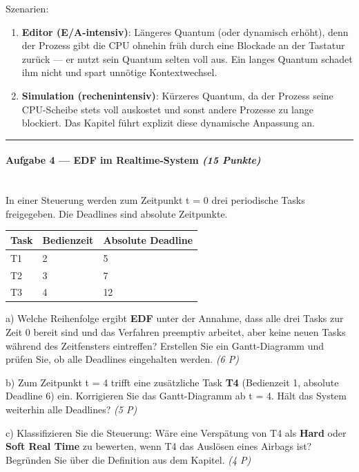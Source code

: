 \documentclass[11pt, a4paper]{article}
\begin{document}
Szenarien:

\begin{enumerate}
  \item \textbf{Editor (E/A-intensiv)}: Längeres Quantum (oder dynamisch erhöht), denn der Prozess gibt die CPU ohnehin früh durch eine Blockade an der Tastatur zurück — er nutzt sein Quantum selten voll aus. Ein langes Quantum schadet ihm nicht und spart unnötige Kontextwechsel.
  \item \textbf{Simulation (rechenintensiv)}: Kürzeres Quantum, da der Prozess seine CPU-Scheibe stets voll auskostet und sonst andere Prozesse zu lange blockiert. Das Kapitel führt explizit diese dynamische Anpassung an.
\end{enumerate}


\noindent\textcolor{rulegray}{\rule{\linewidth}{0.4pt}}


\paragraph{Aufgabe 4 — EDF im Realtime-System \textit{(15 Punkte)}}\mbox{}\\[2pt]

In einer Steuerung werden zum Zeitpunkt t = 0 drei periodische Tasks freigegeben. Die Deadlines sind absolute Zeitpunkte.



{\small
\begin{tabularx}{\linewidth}{XXX}
\hline
\rowcolor{tableheadbg}
{\color{white}\textbf{Task}} & {\color{white}\textbf{Bedienzeit}} & {\color{white}\textbf{Absolute Deadline}} \\[2pt]
\hline
\endhead
\hline
\endfoot
T1 & 2 & 5 \\
T2 & 3 & 7 \\
T3 & 4 & 12 \\
\end{tabularx}
}


a) Welche Reihenfolge ergibt \textbf{EDF} unter der Annahme, dass alle drei Tasks zur Zeit 0 bereit sind und das Verfahren preemptiv arbeitet, aber keine neuen Tasks während des Zeitfensters eintreffen? Erstellen Sie ein Gantt-Diagramm und prüfen Sie, ob alle Deadlines eingehalten werden. \textit{(6 P)}


b) Zum Zeitpunkt t = 4 trifft eine zusätzliche Task \textbf{T4} (Bedienzeit 1, absolute Deadline 6) ein. Korrigieren Sie das Gantt-Diagramm ab t = 4. Hält das System weiterhin alle Deadlines? \textit{(5 P)}


c) Klassifizieren Sie die Steuerung: Wäre eine Verspätung von T4 als \textbf{Hard} oder \textbf{Soft Real Time} zu bewerten, wenn T4 das Auslösen eines Airbags ist? Begründen Sie über die Definition aus dem Kapitel. \textit{(4 P)}
\end{document}
